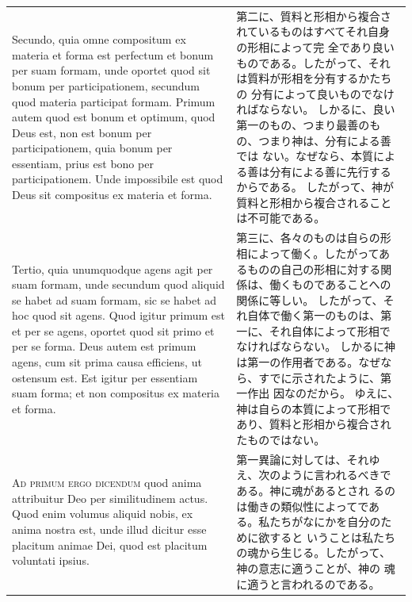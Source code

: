 \documentclass[paper=a4paper,fontsize=10pt,jafontsize=9pt,titlepage]{jlreq}
\begin{document}
\begin{longtable}{p{21em}p{21em}}
Secundo, quia omne compositum ex materia et forma est perfectum et
 bonum per suam formam, unde oportet quod sit bonum per participationem,
 secundum quod materia participat formam.
Primum autem quod est bonum et optimum, quod Deus est, non est bonum per participationem, quia bonum per essentiam, prius est bono per participationem.
Unde impossibile est quod Deus sit compositus ex materia et forma.

&

第二に、質料と形相から複合されているものはすべてそれ自身の形相によって完
 全であり良いものである。したがって、それは質料が形相を分有するかたちの
 分有によって良いものでなければならない。
しかるに、良い第一のもの、つまり最善のもの、つまり神は、分有による善では
ない。なぜなら、本質による善は分有による善に先行するからである。
したがって、神が質料と形相から複合されることは不可能である。
\\


Tertio, quia unumquodque agens agit per suam formam, unde secundum quod aliquid se habet ad suam formam, sic se habet ad hoc quod sit agens.
Quod igitur primum est et per se agens, oportet quod sit primo et per se
 forma.
Deus autem est primum agens, cum sit prima causa efficiens, ut
 ostensum est.
Est igitur per essentiam suam forma; et non compositus ex materia et
 forma.

&


第三に、各々のものは自らの形相によって働く。したがってあるものの自己の形相に対する関係は、働くものであることへの関係に等しい。
したがって、それ自体で働く第一のものは、第一に、それ自体によって形相でなければならない。
しかるに神は第一の作用者である。なぜなら、すでに示されたように、第一作出
 因なのだから。
ゆえに、神は自らの本質によって形相であり、質料と形相から複合されたものではない。

\\




\textsc{Ad primum ergo dicendum} quod anima attribuitur Deo per
 similitudinem actus. Quod enim volumus aliquid nobis, ex anima nostra
 est, unde illud dicitur esse placitum animae Dei, quod est placitum
 voluntati ipsius.

&

第一異論に対しては、それゆえ、次のように言われるべきである。神に魂があるとされ
 るのは働きの類似性によってである。私たちがなにかを自分のために欲すると
 いうことは私たちの魂から生じる。したがって、神の意志に適うことが、神の
 魂に適うと言われるのである。


\\


\end{longtable}
\end{document}
